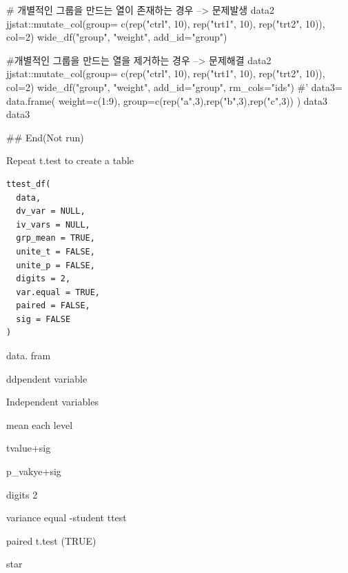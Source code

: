 \documentclass[a4paper]{book}
\begin{document}
\begin{Examples}
\begin{ExampleCode}
# 개별적인 그룹을 만드는 열이 존재하는 경우 --> 문제발생
data2 %
    jjstat::mutate_col(group= c(rep("ctrl", 10),
          rep("trt1", 10), rep("trt2", 10)), col=2)%
          wide_df("group", "weight", add_id="group")

#개별적인 그룹을 만드는 열을 제거하는 경우 --> 문제해결
data2 %
  jjstat::mutate_col(group= c(rep("ctrl", 10),
  rep("trt1", 10), rep("trt2", 10)),  col=2)%
  wide_df("group", "weight", add_id="group", rm_cols="ids") %
#'
data3= data.frame(
  weight=c(1:9),
  group=c(rep("a",3),rep("b",3),rep("c",3))
)
data3
data3 %


## End(Not run)
\end{ExampleCode}
\end{Examples}
%
\begin{Description}
Repeat t.test to create a table
\end{Description}
%
\begin{Usage}
\begin{verbatim}
ttest_df(
  data,
  dv_var = NULL,
  iv_vars = NULL,
  grp_mean = TRUE,
  unite_t = FALSE,
  unite_p = FALSE,
  digits = 2,
  var.equal = TRUE,
  paired = FALSE,
  sig = FALSE
)
\end{verbatim}
\end{Usage}
%
\begin{Arguments}
\begin{ldescription}
\item[\code{data}] data. fram

\item[\code{dv\_var}] ddpendent variable

\item[\code{iv\_vars}] Independent variables

\item[\code{grp\_mean}] mean each level

\item[\code{unite\_t}] tvalue+sig

\item[\code{unite\_p}] p\_vakye+sig

\item[\code{digits}] digits 2

\item[\code{var.equal}] variance equal -student ttest

\item[\code{paired}] paired t.test (TRUE)

\item[\code{sig}] star
\end{ldescription}
\end{Arguments}
\end{document}
